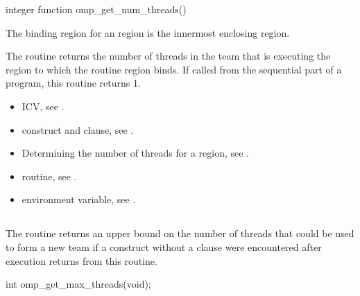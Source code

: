 \begin{fortranspecific}
\begin{ompfFunction}
integer function omp_get_num_threads()
\end{ompfFunction}
\end{fortranspecific}

\binding
The binding region for an  region is the 
innermost enclosing  region.

\effect
The  routine returns the number of threads 
in the team that is executing the  region to which the 
routine region binds. If called from the sequential part of a program, 
this routine returns 1.

\crossreferences
\begin{itemize}
\item {} ICV, see
.

\item {} construct and  clause, see
.

\item Determining the number of threads for a  region, see
.

\item {} routine, see
.

\item {} environment variable, see
.
\end{itemize}



\subsection{}
\label{subsec:omp_get_max_threads}
\summary
The  routine returns an upper bound on the 
number of threads that could be used to form a new team if a 
 construct without a  clause were 
encountered after execution returns from this routine.

\format
\begin{ccppspecific}
\begin{ompcFunction}
int omp_get_max_threads(void);
\end{ompcFunction}
\end{ccppspecific}

